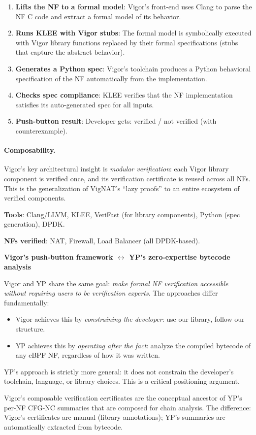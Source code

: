 \begin{enumerate}
  \item \textbf{Lifts the NF to a formal model}: Vigor's front-end uses Clang to parse the NF C code and extract a formal model of its behavior.
  \item \textbf{Runs KLEE with Vigor stubs}: The formal model is symbolically executed with Vigor library functions replaced by their formal specifications (stubs that capture the abstract behavior).
  \item \textbf{Generates a Python spec}: Vigor's toolchain produces a Python behavioral specification of the NF automatically from the implementation.
  \item \textbf{Checks spec compliance}: KLEE verifies that the NF implementation satisfies its auto-generated spec for all inputs.
  \item \textbf{Push-button result}: Developer gets: verified / not verified (with counterexample).
\end{enumerate}

\paragraph{Composability.}
Vigor's key architectural insight is \emph{modular verification}: each Vigor library component is verified once, and its verification certificate is reused across all NFs. This is the generalization of VigNAT's ``lazy proofs'' to an entire ecosystem of verified components.

\textbf{Tools}: Clang/LLVM, KLEE, VeriFast (for library components), Python (spec generation), DPDK.

\textbf{NFs verified}: NAT, Firewall, Load Balancer (all DPDK-based).

\begin{analogybox}
\textbf{Vigor's push-button framework $\leftrightarrow$ YP's zero-expertise bytecode analysis}

Vigor and YP share the same goal: \emph{make formal NF verification accessible without requiring users to be verification experts}. The approaches differ fundamentally:

\begin{itemize}
  \item Vigor achieves this by \emph{constraining the developer}: use our library, follow our structure.
  \item YP achieves this by \emph{operating after the fact}: analyze the compiled bytecode of any eBPF NF, regardless of how it was written.
\end{itemize}

YP's approach is strictly more general: it does not constrain the developer's toolchain, language, or library choices. This is a critical positioning argument.

Vigor's composable verification certificates are the conceptual ancestor of YP's per-NF CFG-NC summaries that are composed for chain analysis. The difference: Vigor's certificates are manual (library annotations); YP's summaries are automatically extracted from bytecode.
\end{analogybox}

